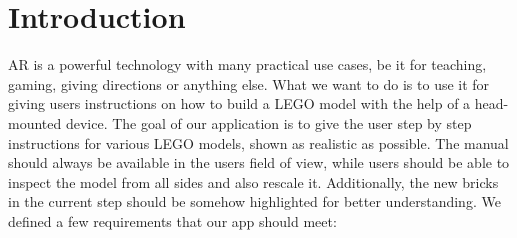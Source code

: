 \chapter{Introduction}
\label{cha:introduction}

AR is a powerful technology with many practical use cases, be it for teaching, gaming, giving directions or anything else. What we want to do is to use it for giving users instructions on how to build a LEGO model with the help of a head-mounted device.\newline
The goal of our application is to give the user step by step instructions for various LEGO models, shown as realistic as possible. The manual should always be available in the users field of view, while users should be able to inspect the model from all sides and also rescale it. Additionally, the new bricks in the current step should be somehow highlighted for better understanding. We defined a few requirements that our app should meet:

